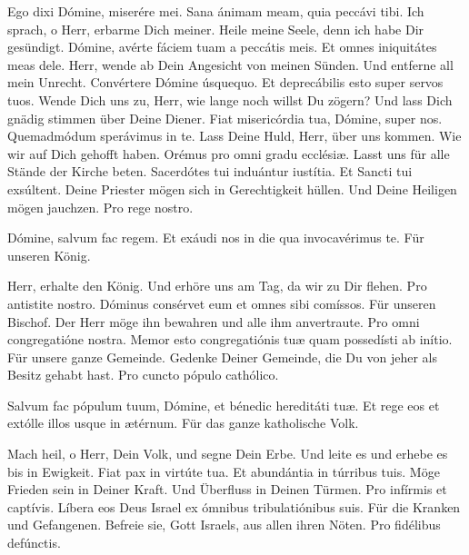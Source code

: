 \documentclass[fontsize=10pt,paper=A5,twoside,BCOR=1mm,DIV=21,headinclude]{scrarticle}
\begin{document}
\begin{paracol}{2}\pcb
\V Ego dixi Dómine, miserére mei.
\R Sana ánimam meam, quia peccávi tibi.
	\switchcolumn 
	\V Ich sprach, o Herr, erbarme Dich meiner.
	\R Heile meine Seele, denn ich habe Dir gesündigt.
\switchcolumn*
\V Dómine, avérte fáciem tuam a peccátis meis.
\R Et omnes iniquitátes meas dele.
	\switchcolumn 
	\V Herr, wende ab Dein Angesicht von meinen Sünden.
	\R Und entferne all mein Unrecht.
\switchcolumn*
\V Convértere Dómine úsquequo.
\R Et deprecábilis esto super servos tuos.
	\switchcolumn 
	\V Wende Dich uns zu, Herr, wie lange noch willst Du zögern? 
	\R Und lass Dich gnädig stimmen über Deine Diener.
\switchcolumn*
\V Fiat misericórdia tua, Dómine, super nos.
\R Quemadmódum sperávimus in te.
	\switchcolumn 
	\V Lass Deine Huld, Herr, über uns kommen.
	\R Wie wir auf Dich gehofft haben.
\switchcolumn *
\V Orémus pro omni gradu ecclésiæ.
	\switchcolumn
	\V Lasst uns für alle Stände der Kirche beten.
\switchcolumn *
\V Sacerdótes tui induántur iustítia.
\R Et Sancti tui exsúltent.
	\switchcolumn
	\V Deine Priester mögen sich in Gerechtigkeit hüllen.
	\R Und Deine Heiligen mögen jauchzen.
\switchcolumn*
\V Pro rege nostro.

\V Dómine, salvum fac regem.
\R Et exáudi nos in die qua invocavérimus te.
	\switchcolumn
	\V Für unseren König. 

	\V Herr, erhalte den König.
	\R Und erhöre uns am Tag, da wir zu Dir flehen.
\switchcolumn*
\V Pro antistite nostro.
\R Dóminus consérvet eum et omnes sibi comíssos.
	\switchcolumn
	\V Für unseren Bischof.
	\R Der Herr möge ihn bewahren und alle ihm anvertraute.
\switchcolumn*
\V Pro omni congregatióne nostra.
\R Memor esto congregatiónis tuæ quam possedísti ab inítio.	
	\switchcolumn
	\V Für unsere ganze Gemeinde.
	\R Gedenke Deiner Gemeinde, die Du von jeher als Besitz gehabt hast.
\switchcolumn*
\V Pro cuncto pópulo cathólico.

\V Salvum fac pópulum tuum, Dómine, et bénedic hereditáti tuæ.
\R Et rege eos et extólle illos usque in ætérnum.
	\switchcolumn 
	\V Für das ganze katholische Volk.

	\V Mach heil, o Herr, Dein Volk, und segne Dein Erbe.
	\R Und leite es und erhebe es bis in Ewigkeit.
\switchcolumn*
\V Fiat pax in virtúte tua.
\R Et abundántia in túrribus tuis.
	\switchcolumn 
	\V Möge Frieden sein in Deiner Kraft.
	\R Und Überfluss in Deinen Türmen.
\switchcolumn*
\V Pro infírmis et captívis.
\R Líbera eos Deus Israel ex ómnibus tribulatiónibus suis.
	\switchcolumn
	\V Für die Kranken und Gefangenen.
	\R Befreie sie, Gott Israels, aus allen ihren Nöten.
\switchcolumn*
\V Pro fidélibus defúnctis.


\end{paracol}
\end{document}
